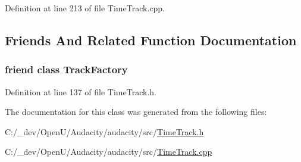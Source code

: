 Definition at line 213 of file Time\+Track.\+cpp.



\subsection{Friends And Related Function Documentation}
\subsubsection[{\texorpdfstring{Track\+Factory}{TrackFactory}}]{\setlength{\rightskip}{0pt plus 5cm}friend class {\bf Track\+Factory}\hspace{0.3cm}{\ttfamily [friend]}}\hypertarget{class_time_track_a9090c4844308a62885cce4b693b74666}{}\label{class_time_track_a9090c4844308a62885cce4b693b74666}


Definition at line 137 of file Time\+Track.\+h.



The documentation for this class was generated from the following files\+:\begin{DoxyCompactItemize}
\item 
C\+:/\+\_\+dev/\+Open\+U/\+Audacity/audacity/src/\hyperlink{_time_track_8h}{Time\+Track.\+h}\item 
C\+:/\+\_\+dev/\+Open\+U/\+Audacity/audacity/src/\hyperlink{_time_track_8cpp}{Time\+Track.\+cpp}\end{DoxyCompactItemize}
